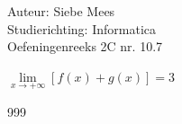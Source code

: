 \documentclass[a4paper]{article}
\begin{document}
  
\noindent \large Auteur: Siebe Mees \\
\noindent \large Studierichting: Informatica \\
\noindent \large Oefeningenreeks 2C nr. 10.7 \\

\medskip

\normalsize

$\lim\limits_{x\rightarrow +\infty} [f(x)+g(x)] = 3 $ \\

\begin{thebibliography}{999}
\end{thebibliography}
\end{document}

